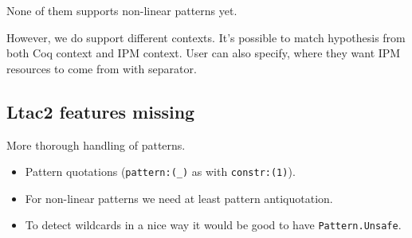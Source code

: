 None of them supports non-linear patterns yet.

However, we do support different contexts.
It's possible to match hypothesis from both Coq context and IPM context.
User can also specify, where they want IPM resources to come from with separator.


\subsection{Ltac2 features missing}

More thorough handling of patterns.
\begin{itemize}
\item Pattern quotations (\verb|pattern:(_)| as with \verb|constr:(1)|).
\item For non-linear patterns we need at least pattern antiquotation.
\item To detect wildcards in a nice way it would be good to have \verb|Pattern.Unsafe|.
\end{itemize}

